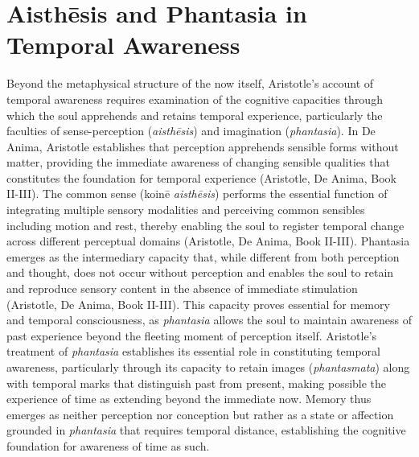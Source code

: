 \documentclass[12pt,a4paper]{article}
\begin{document}
\section{Aisth\=esis and Phantasia in Temporal Awareness}

Beyond the metaphysical structure of the now itself, Aristotle's account of temporal awareness requires examination of the cognitive capacities through which the soul apprehends and retains temporal experience, particularly the faculties of sense-perception (\textit{aisthēsis}) and imagination (\textit{phantasia}). In De Anima, Aristotle establishes that perception apprehends sensible forms without matter, providing the immediate awareness of changing sensible qualities that constitutes the foundation for temporal experience (Aristotle, De Anima, Book II-III). The common sense (koinē \textit{aisthēsis}) performs the essential function of integrating multiple sensory modalities and perceiving common sensibles including motion and rest, thereby enabling the soul to register temporal change across different perceptual domains (Aristotle, De Anima, Book II-III). Phantasia emerges as the intermediary capacity that, while different from both perception and thought, does not occur without perception and enables the soul to retain and reproduce sensory content in the absence of immediate stimulation (Aristotle, De Anima, Book II-III). This capacity proves essential for memory and temporal consciousness, as \textit{phantasia} allows the soul to maintain awareness of past experience beyond the fleeting moment of perception itself. Aristotle's treatment of \textit{phantasia} establishes its essential role in constituting temporal awareness, particularly through its capacity to retain images (\textit{phantasmata}) along with temporal marks that distinguish past from present, making possible the experience of time as extending beyond the immediate now. Memory thus emerges as neither perception nor conception but rather as a state or affection grounded in \textit{phantasia} that requires temporal distance, establishing the cognitive foundation for awareness of time as such.
\end{document}
